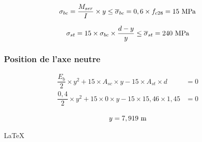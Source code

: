 \documentclass[12pt,a4paper]{report}
\newcommand{\sgma}[1]{\sigma_{#1}}
\newcommand{\sigmabar}[1]{\overline{\sigma}_{#1}}
\begin{document}
	\[ \sgma{bc} = \dfrac{M_{ser}}{I} \times y \leq \sigmabar{bc} = 0,6 \times f_{c28} = 15\mpa \]
	
	\[ \sgma{st} = 15 \times \sgma{bc} \times \dfrac{d - y}{y} \leq \sigmabar{st} = 240\mpa \]
	
	\subsubsection{Position de l'axe neutre}
	
	\[ \begin{aligned}
		\dfrac{E_{b}}{2} \times y^{2} + 15 \times A_{sc} \times y - 15 \times A_{st} \times d &= 0 \\
		\dfrac{0,4}{2} \times y^{2} + 15 \times 0 \times y - 15 \times 15,46 \times 1,45 &= 0 
	\end{aligned} \]
	
	\[ y = 7,919\meterl \]
	

	
	
	
	
	
	
	
	
	\vfill \hfill \Huge \LaTeX
	
\end{document}
